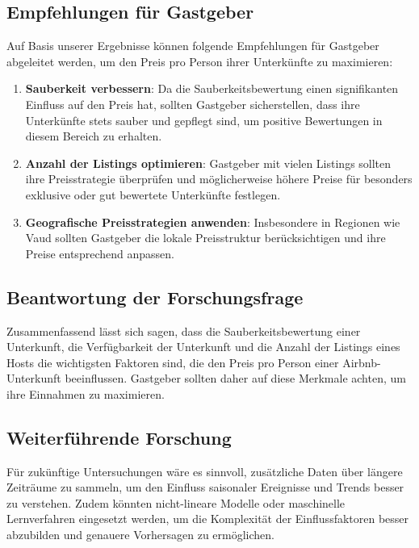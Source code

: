 \documentclass[
  journal,
]{IEEEtran}%
\begin{document}
\hypertarget{empfehlungen-fuxfcr-gastgeber}{%
\subsection{Empfehlungen für
Gastgeber}\label{empfehlungen-fuxfcr-gastgeber}}

Auf Basis unserer Ergebnisse können folgende Empfehlungen für Gastgeber
abgeleitet werden, um den Preis pro Person ihrer Unterkünfte zu
maximieren:

\begin{enumerate}
\def\labelenumi{\arabic{enumi}.}
\item
  \textbf{Sauberkeit verbessern}: Da die Sauberkeitsbewertung einen
  signifikanten Einfluss auf den Preis hat, sollten Gastgeber
  sicherstellen, dass ihre Unterkünfte stets sauber und gepflegt sind,
  um positive Bewertungen in diesem Bereich zu erhalten.
\item
  \textbf{Anzahl der Listings optimieren}: Gastgeber mit vielen Listings
  sollten ihre Preisstrategie überprüfen und möglicherweise höhere
  Preise für besonders exklusive oder gut bewertete Unterkünfte
  festlegen.
\item
  \textbf{Geografische Preisstrategien anwenden}: Insbesondere in
  Regionen wie Vaud sollten Gastgeber die lokale Preisstruktur
  berücksichtigen und ihre Preise entsprechend anpassen.
\end{enumerate}

\hypertarget{beantwortung-der-forschungsfrage}{%
\subsection{Beantwortung der
Forschungsfrage}\label{beantwortung-der-forschungsfrage}}

Zusammenfassend lässt sich sagen, dass die Sauberkeitsbewertung einer
Unterkunft, die Verfügbarkeit der Unterkunft und die Anzahl der Listings
eines Hosts die wichtigsten Faktoren sind, die den Preis pro Person
einer Airbnb-Unterkunft beeinflussen. Gastgeber sollten daher auf diese
Merkmale achten, um ihre Einnahmen zu maximieren.

\hypertarget{weiterfuxfchrende-forschung}{%
\subsection{Weiterführende
Forschung}\label{weiterfuxfchrende-forschung}}

Für zukünftige Untersuchungen wäre es sinnvoll, zusätzliche Daten über
längere Zeiträume zu sammeln, um den Einfluss saisonaler Ereignisse und
Trends besser zu verstehen. Zudem könnten nicht-lineare Modelle oder
maschinelle Lernverfahren eingesetzt werden, um die Komplexität der
Einflussfaktoren besser abzubilden und genauere Vorhersagen zu
ermöglichen.
\end{document}
